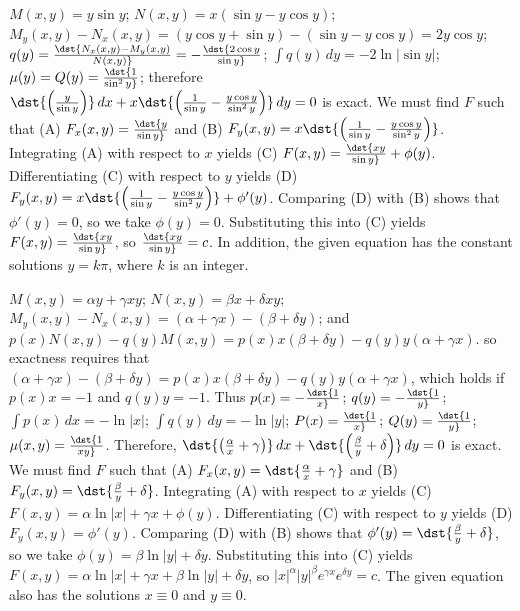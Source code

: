 \documentclass[dvips]{book}
\renewcommand{\exer}[1]{\par\medskip\;\noindent{\color{red}\bf #1.}}
\numberwithin{example}{section}
\numberwithin{equation}{section}
\numberwithin{theorem}{section}
\numberwithin{table}{section}
\numberwithin{figure}{section}
\begin{document}
\exer{2.6.16}
$M(x,y)=y\sin y$;\;
$N(x,y)=x(\sin y-y\cos y)$;\;
 $M_y(x,y)-N_x(x,y)=(y\cos y+\sin y)-(\sin y-y\cos y)=2y\cos y$;
$q(y)=\dst{N_x(x,y)-M_y(x,y)\over N(x,y)}=-\dst{2\cos y\over\sin y}$;\;
$\int q(y)\,dy=-2\ln|\sin y|$;\;
$\mu(y)=Q(y)=\dst{1\over\sin^2y}$;
therefore
$\dst{\left(y\over\sin y\right)}\,dx+
x\dst{\left({1\over\sin y}-{y\cos y\over\sin^2y}\right)}\,dy=0$
is exact. We must find $F$ such that
(A) $F_x(x,y)=\dst{y\over\sin y}$ and
(B) $F_y(x,y)=x\dst{\left({1\over\sin y}-{y\cos y\over\sin^2y}\right)}$.
Integrating (A) with respect to $x$ yields
(C) $F(x,y)=\dst{xy\over\sin y}+\phi(y)$.
Differentiating (C) with respect to $y$  yields
(D) $F_y(x,y)=x\dst{\left({1\over\sin y}-{y\cos y\over\sin^2y}\right)}
+\phi'(y)$.
Comparing (D) with (B)  shows that
$\phi'(y)=0$, so we take
$\phi(y)=0$.
Substituting this into (C) yields
$F(x,y)=\dst{xy\over\sin y}$,
so $\dst{xy\over\sin y}=c$. In addition, the given equation has the
constant solutions $y=k\pi$, where $k$ is an integer.


\exer{2.6.18}
$M(x,y)=\alpha y+\gamma xy$;\;
$N(x,y)=\beta x+ \delta xy$;\;
 $M_y(x,y)-N_x(x,y)=(\alpha+\gamma x)-(\beta+\delta y)$;
and  $p(x)N(x,y)-q(y)M(x,y)=p(x)x(\beta + \delta y)-
q(y)y(\alpha +\gamma x)$.
so exactness requires that
 $(\alpha+\gamma x)-(\beta+\delta y)=
p(x)x(\beta+\delta y)-
q(y)y(\alpha+\gamma x)$,
which holds if
  $p(x)x=-1$ and $q(y)y=-1$. Thus
 $p(x)=-\dst{1\over x}$;\;
 $q(y)=-\dst{1\over y}$;\;
$\int p(x)\,dx=-\ln|x|$;\;
$\int q(y)\,dy=-\ln|y|$;\;
$P(x)=\dst{1\over x}$;
$Q(y)=\dst{1\over y}$;
$\mu(x,y)=\dst{1\over xy}$.
Therefore,
$\dst{\left({\alpha\over x}+\gamma\right)}\,dx+
\dst{\left({\beta\over y}+\delta\right)}\,dy=0$
is exact.
We must find $F$ such that
(A) $F_x(x,y)=\dst{{\alpha\over x}+\gamma}$ and
(B) $F_y(x,y)=\dst{{\beta\over y}+\delta}$.
Integrating (A) with respect to $x$ yields
(C) $F(x,y)=\alpha\ln|x|+\gamma x+\phi(y)$.
Differentiating (C) with respect to $y$  yields
(D) $F_y(x,y)=\phi'(y)$.
Comparing (D) with (B)  shows that
$\phi'(y)=\dst{{\beta\over y}+\delta}$, so we take
$\phi(y)=\beta\ln|y|+\delta y$.
Substituting this into (C) yields
$F(x,y)=\alpha\ln|x|+\gamma x+\beta\ln|y|+\delta y$,
so $|x|^\alpha|y|^\beta e^{\gamma x}e^{\delta y}=c$.
The given equation also has the solutions $x\equiv0$
and $y\equiv0$.
\end{document}
